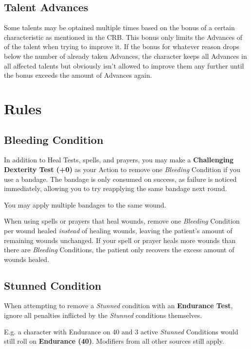 \documentclass[parskip=full,11pt]{wfrp-short}
\begin{document}
\subsection{Talent Advances}
Some talents may be optained multiple times based on the bonus of a certain
characteristic as mentioned in the CRB. This bonus only limits the Advances of
of the talent when trying to improve it. If the bonus for whatever reason drops
below the number of already taken Advances, the character keeps all Advances in
all affected talents but obviously isn't allowed to improve them any further
until the bonus exceeds the amount of Advances again.

\section{Rules}

\subsection{Bleeding Condition}
In addition to Heal Tests, spells, and prayers, you may make a
\textbf{Challenging Dexterity Test (+0)} as your Action to remove one
\textit{Bleeding} Condition if you use a bandage.
The bandage is only consumed on success, as failure is noticed immediately,
allowing you to try reapplying the same bandage next round.

You may apply multiple bandages to the same wound.

When using spells or prayers that heal wounds, remove one \textit{Bleeding}
Condition per wound healed \textit{instead} of healing wounds, leaving the
patient's amount of remaining wounds unchanged.
If your spell or prayer heals more wounds than there are \textit{Bleeding}
Conditions, the patient only recovers the excess amount of
wounds healed.

\subsection{Stunned Condition}
When attempting to remove a \textit{Stunned} condition with an
\textbf{Endurance Test}, ignore all penalties inflicted by the \textit{Stunned}
conditions themselves.

E.g. a character with Endurance on 40 and 3 active \textit{Stunned} Conditions
would still roll on \textbf{Endurance (40)}.
Modifiers from all other sources still apply.
\end{document}
